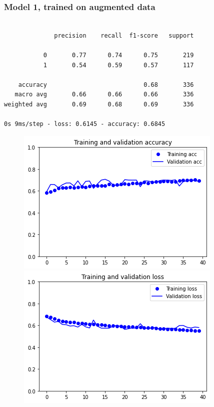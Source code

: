\documentclass{article}
\begin{document}
\subsubsection{Model 1, trained on augmented data}

\begin{verbatim}

              precision    recall  f1-score   support

           0       0.77      0.74      0.75       219
           1       0.54      0.59      0.57       117

    accuracy                           0.68       336
   macro avg       0.66      0.66      0.66       336
weighted avg       0.69      0.68      0.69       336

0s 9ms/step - loss: 0.6145 - accuracy: 0.6845

\end{verbatim}


\begin{figure}[h]
    \centering
    \begin{minipage}{0.45\textwidth}
        \centering
        \includegraphics[scale=0.46]{./img/scratchVal2_2.png}
    \end{minipage}\hfill
    \begin{minipage}{0.45\textwidth}
        \centering
        \includegraphics[scale=0.46]{./img/scratchLoss2_2.png}
    \end{minipage}
\end{figure}
\end{document}
